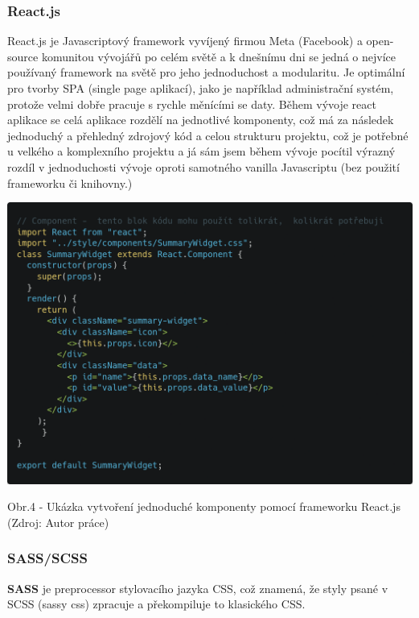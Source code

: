 \documentclass[12pt,a4paper]{report}
\begin{document}
  \subsubsection{React.js}
  React.js je Javascriptový framework vyvíjený firmou Meta (Facebook) a open-source komunitou
  vývojářů po celém světě a k dnešnímu dni se jedná o nejvíce používaný framework na světě pro
  jeho jednoduchost a modularitu.
  Je optimální pro tvorby SPA (single page aplikací), jako je například administrační systém, protože
  velmi dobře pracuje s rychle měnícími se daty. Během vývoje react aplikace se celá aplikace
  rozdělí na jednotlivé komponenty, což má za následek jednoduchý a přehledný zdrojový kód a
  celou strukturu projektu, což je potřebné u velkého a komplexního projektu a já sám jsem během
  vývoje pocítil výrazný rozdíl v jednoduchosti vývoje oproti samotného vanilla Javascriptu (bez
  použití frameworku či knihovny.)

  \vspace*{0.5cm}
  \noindent\includegraphics[width=\linewidth]{reactCodeblock.png}
  \begin{center}
    Obr.4 - Ukázka vytvoření jednoduché komponenty pomocí frameworku React.js \\
    (Zdroj: Autor práce)
  \end{center}
  \vspace*{0.5cm}

  \subsubsection{SASS/SCSS}
  \textbf{SASS} je preprocessor stylovacího jazyka CSS, což znamená, že styly psané v SCSS (sassy css)
  zpracuje a překompiluje to klasického CSS.
  
\end{document}
